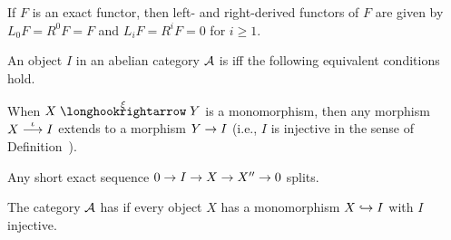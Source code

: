 \documentclass[a4paper,parskip=half,numbers=enddot, DIV=12]{scrreprt}
\begin{document}
\begin{example}
	If $F$ is an exact functor, then left- and right-derived functors of $F$ are given by $L_0F=R^0F=F$ and $L_iF=R^iF=0$ for $i\geq 1$.
\end{example}
\begin{defi}
	An object $I$ in an abelian category $\mathcal{A}$ is  iff the following equivalent conditions hold.
	\begin{alphanumerate}
		\item When $X\monomorphism[\xi] Y$ is a monomorphism, then any morphism $X\morphism[\iota] I$ extends to a morphism $Y\morphism I$ (i.e., $I$ is injective in the sense of Definition~).
		\item Any short exact sequence $0\morphism I\morphism X\morphism X''\morphism 0$ splits.
	\end{alphanumerate}
	The category $\mathcal{A}$ has  if every object $X$ has a monomorphism $X\monomorphism I$ with $I$ injective.
\end{defi}
\end{document}
